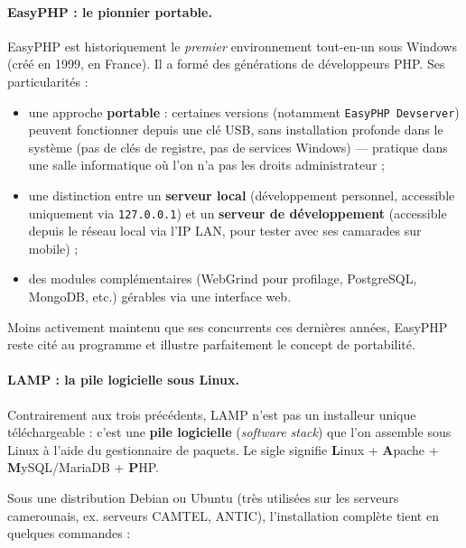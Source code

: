 \documentclass[11pt]{article}
\newcommand{\cle}[1]{{\popxbold\color{popdark}#1}}
\begin{document}
\paragraph{EasyPHP : le pionnier portable.}
\cle{EasyPHP} est historiquement le \emph{premier} environnement tout-en-un sous Windows (créé en 1999, en France). Il a formé des générations de développeurs PHP. Ses particularités :
\begin{itemize}
\item une approche \textbf{portable} : certaines versions (notamment \texttt{EasyPHP Devserver}) peuvent fonctionner depuis une clé USB, sans installation profonde dans le système (pas de clés de registre, pas de services Windows) — pratique dans une salle informatique où l'on n'a pas les droits administrateur ;
\item une distinction entre un \textbf{serveur local} (développement personnel, accessible uniquement via \texttt{127.0.0.1}) et un \textbf{serveur de développement} (accessible depuis le réseau local via l'IP LAN, pour tester avec ses camarades sur mobile) ;
\item des modules complémentaires (WebGrind pour profilage, PostgreSQL, MongoDB, etc.) gérables via une interface web.
\end{itemize}
Moins activement maintenu que ses concurrents ces dernières années, EasyPHP reste cité au programme et illustre parfaitement le concept de portabilité.

\paragraph{LAMP : la pile logicielle sous Linux.}
Contrairement aux trois précédents, \cle{LAMP} n'est pas un installeur unique téléchargeable : c'est une \textbf{pile logicielle} (\emph{software stack}) que l'on assemble sous Linux à l'aide du gestionnaire de paquets. Le sigle signifie \textbf{L}inux + \textbf{A}pache + \textbf{M}ySQL/MariaDB + \textbf{P}HP.

Sous une distribution Debian ou Ubuntu (très utilisées sur les serveurs camerounais, ex. serveurs CAMTEL, ANTIC), l'installation complète tient en quelques commandes :
\end{document}
